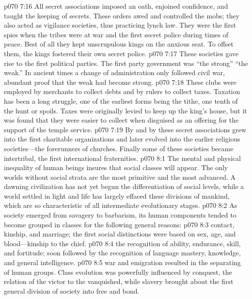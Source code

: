 \vs p070 7:16 All secret associations imposed an oath, enjoined confidence, and taught the keeping of secrets. These orders awed and controlled the mobs; they also acted as vigilance societies, thus practicing lynch law. They were the first spies when the tribes were at war and the first secret police during times of peace. Best of all they kept unscrupulous kings on the anxious seat. To offset them, the kings fostered their own secret police.
\vs p070 7:17 These societies gave rise to the first political parties. The first party government was “the strong”  “the weak.” In ancient times a change of administration only followed civil war, abundant proof that the weak had become strong.
\vs p070 7:18 These clubs were employed by merchants to collect debts and by rulers to collect taxes. Taxation has been a long struggle, one of the earliest forms being the tithe, one tenth of the hunt or spoils. Taxes were originally levied to keep up the king’s house, but it was found that they were easier to collect when disguised as an offering for the support of the temple service.
\vs p070 7:19 By and by these secret associations grew into the first charitable organizations and later evolved into the earlier religious societies---the forerunners of churches. Finally some of these societies became intertribal, the first international fraternities.
\vs p070 8:1 The mental and physical inequality of human beings insures that social classes will appear. The only worlds without social strata are the most primitive and the most advanced. A dawning civilization has not yet begun the differentiation of social levels, while a world settled in light and life has largely effaced these divisions of mankind, which are so characteristic of all intermediate evolutionary stages.
\vs p070 8:2 As society emerged from savagery to barbarism, its human components tended to become grouped in classes for the following general reasons:
\pc \vs p070 8:3 \bibnobreakspace {}contact, kinship, and marriage; the first social distinctions were based on sex, age, and blood---kinship to the chief.
\pc \vs p070 8:4 \bibnobreakspace {}the recognition of ability, endurance, skill, and fortitude; soon followed by the recognition of language mastery, knowledge, and general intelligence.
\pc \vs p070 8:5 \bibnobreakspace {}war and emigration resulted in the separating of human groups. Class evolution was powerfully influenced by conquest, the relation of the victor to the vanquished, while slavery brought about the first general division of society into free and bond.
